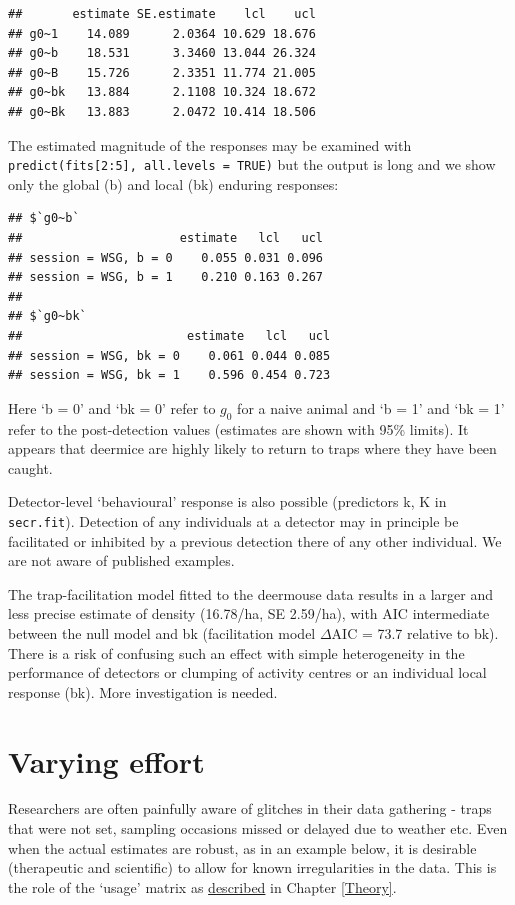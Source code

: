 \documentclass[
]{book}
\begin{document}
\begin{verbatim}
##       estimate SE.estimate    lcl    ucl
## g0~1    14.089      2.0364 10.629 18.676
## g0~b    18.531      3.3460 13.044 26.324
## g0~B    15.726      2.3351 11.774 21.005
## g0~bk   13.884      2.1108 10.324 18.672
## g0~Bk   13.883      2.0472 10.414 18.506
\end{verbatim}

The estimated magnitude of the responses may be examined with \texttt{predict(fits{[}2:5{]},\ all.levels\ =\ TRUE)} but the output is long and we show only the global (b) and local (bk) enduring responses:

\begin{verbatim}
## $`g0~b`
##                      estimate   lcl   ucl
## session = WSG, b = 0    0.055 0.031 0.096
## session = WSG, b = 1    0.210 0.163 0.267
## 
## $`g0~bk`
##                       estimate   lcl   ucl
## session = WSG, bk = 0    0.061 0.044 0.085
## session = WSG, bk = 1    0.596 0.454 0.723
\end{verbatim}

Here `b = 0' and `bk = 0' refer to \(g_0\) for a naive animal and `b = 1' and `bk = 1' refer to the post-detection values (estimates are shown with 95\% limits). It appears that deermice are highly likely to return to traps where they have been caught.

Detector-level `behavioural' response is also possible (predictors k, K in \texttt{secr.fit}). Detection of any individuals at a detector may in principle be facilitated or inhibited by a previous detection there of any other individual. We are not aware of published examples.

The trap-facilitation model fitted to the deermouse data results in a larger and less precise estimate of density (16.78/ha, SE 2.59/ha), with AIC intermediate between the null model and bk (facilitation model \(\Delta\)AIC = 73.7 relative to bk). There is a risk of confusing such an effect with simple heterogeneity in the performance of detectors or clumping of activity centres or an individual local response (bk). More investigation is needed.

\section{Varying effort}\label{varying-effort-1}


Researchers are often painfully aware of glitches in their data gathering - traps that were not set, sampling occasions missed or delayed due to weather etc. Even when the actual estimates are robust, as in an example below, it is desirable (therapeutic and scientific) to allow for known irregularities in the data. This is the role of the `usage' matrix as \hyperref[varying-effort]{described} in Chapter \ref{Theory}.
\end{document}
